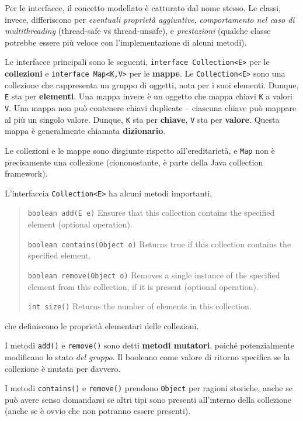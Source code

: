 \documentclass[\fontsizeclass,twocolumn]{\classname}
\theoremstyle{definition}
\theoremstyle{definition}
\begin{document}
Per le interfacce, il concetto modellato è catturato dal nome stesso. Le
classi, invece, differiscono per \emph{eventuali proprietà aggiuntive},
\emph{comportamento nel caso di multithreading} (thread\--safe vs
thread\--unsafe), e \emph{prestazioni} (qualche classe potrebbe essere più
veloce con l'implementazione di alcuni metodi).

Le interfacce principali sono le seguenti, \texttt{interface Collection<E>} per
le \textbf{collezioni} e \texttt{interface Map<K,V>} per le \textbf{mappe}. Le
\texttt{Collection<E>} sono una collezione che rappresenta un gruppo di
oggetti, nota per i suoi elementi. Dunque, \texttt{E} sta per
\textbf{elementi}. Una mappa invece è un oggetto che mappa chiavi \texttt{K} a
valori \texttt{V}. Una mappa non può contenere chiavi duplicate -- ciascuna
chiave può mappare al più un singolo valore. Dunque, \texttt{K} sta per
\textbf{chiave}, \texttt{V} sta per \textbf{valore}. Questa mappa è
generalmente chiamata \textbf{dizionario}.

Le collezioni e le mappe sono disgiunte rispetto all'ereditarietà, e
\texttt{Map} non è precisamente una collezione (ciononostante, è parte della
Java collection framework).

L'interfaccia \texttt{Collection<E>} ha alcuni metodi importanti,
\begin{quote}
    \footnotesize{\texttt{boolean	add(E e)}	Ensures that this collection contains the specified element (optional operation).

            \texttt{boolean	contains(Object o)}	Returns true if this collection contains the specified element.

    \texttt{boolean	remove(Object o)}	Removes a single instance of the specified element from this collection, if it is present (optional operation).

\texttt{int	size()}	Returns the number of elements in this collection.}
\end{quote}
che definiscono le proprietà elementari delle collezioni.

I metodi \texttt{add()} e \texttt{remove()} sono detti \textbf{metodi
mutatori}, poiché potenzialmente modificano lo stato \emph{del gruppo}. Il
booleano come valore di ritorno specifica se la collezione è mutata per
davvero.

I metodi \texttt{contains()} e \texttt{remove()} prendono \texttt{Object} per
ragioni storiche, anche se può avere senso domandarsi se altri tipi sono
presenti all'interno della collezione (anche se è ovvio che non potranno essere
presenti).
\end{document}
